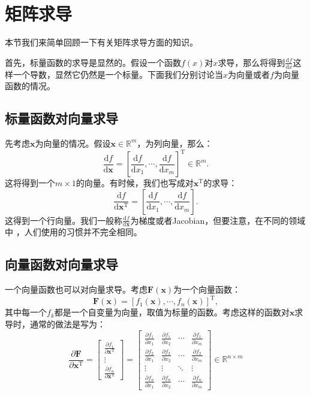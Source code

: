 \chapter{矩阵求导}
本节我们来简单回顾一下有关矩阵求导方面的知识。

首先，标量函数的求导是显然的。假设一个函数$f(x)$对$x$求导，那么将得到$\frac{\mathrm{d}f}{\mathrm{d}x}$这样一个导数，显然它仍然是一个标量。下面我们分别讨论当$x$为向量或者$f$为向量函数的情况。
\section{标量函数对向量求导}
先考虑$\bm{x}$为向量的情况。假设$\bm{x} \in \mathbb{R}^m$，为列向量，那么：
\begin{equation}
\frac{{\mathrm{d}f}}{{\mathrm{d}\bm{x}}} = {\left[ {\frac{{\mathrm{d}f}}{{\mathrm{d}{x_1}}}, \cdots ,\frac{{\mathrm{d}f}}{{\mathrm{d}{x_m}}}} \right]^\mathrm{T}} \in {\mathbb{R}^m}.
\end{equation}
这将得到一个$m \times 1$的向量。有时候，我们也写成对$\bm{x}^\mathrm{T}$的求导：
\begin{equation}
\frac{{\mathrm{d}f}}{{\mathrm{d}\bm{x}^\mathrm{T}}} =  {\left[ {\frac{{\mathrm{d}f}}{{\mathrm{d}{x_1}}}, \cdots ,\frac{{\mathrm{d}f}}{{\mathrm{d}{x_m}}}} \right]}.
\end{equation}
这得到一个行向量。我们一般称$\frac{\mathrm{d}f}{\mathrm{d}\bm{x}}$为梯度或者Jacobian，但要注意，在不同的领域中 ，人们使用的习惯并不完全相同。

\section{向量函数对向量求导}
一个向量函数也可以对向量求导。考虑$\bm{F}(\bm{x})$为一个向量函数：$$\bm{F}(\bm{x}) = [f_1(\bm{x}), \cdots, f_n(\bm{x})]^\mathrm{T},$$其中每一个$f_k$都是一个自变量为向量，取值为标量的函数。考虑这样的函数对$\bm{x}$求导时，通常的做法是写为：
\begin{equation}
\frac{{\partial \bm{F}}}{{\partial {\bm{x}^\mathrm{T}}}} = \left[ {\begin{array}{*{20}{c}}
    {\frac{{\partial {f_1}}}{{\partial {\bm{x}^\mathrm{T}}}}}\\
    \vdots \\
    {\frac{{\partial {f_n}}}{{\partial {\bm{x}^\mathrm{T}}}}}
    \end{array}} \right] = \left[ {\begin{array}{*{20}{c}}
    {\frac{{\partial {f_1}}}{{\partial {x_1}}}}&{\frac{{\partial {f_1}}}{{\partial {x_2}}}}& \cdots &{\frac{{\partial {f_1}}}{{\partial {x_m}}}}\\
    {\frac{{\partial {f_2}}}{{\partial {x_1}}}}&{\frac{{\partial {f_2}}}{{\partial {x_2}}}}& \cdots &{\frac{{\partial {f_2}}}{{\partial {x_m}}}}\\
    \vdots & \vdots & \ddots & \vdots \\
    {\frac{{\partial {f_n}}}{{\partial {x_1}}}}&{\frac{{\partial {f_n}}}{{\partial {x_2}}}}& \cdots &{\frac{{\partial {f_n}}}{{\partial {x_m}}}}
    \end{array}} \right] \in {\mathbb{R}^{n \times m}}
\end{equation}

